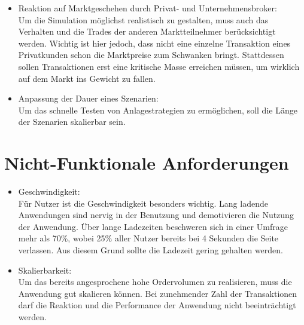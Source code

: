 \begin{itemize}
		\item Reaktion auf Marktgeschehen durch Privat- und Unternehmensbroker: \\
			Um die Simulation möglichst realistisch zu gestalten, muss auch das Verhalten und die Trades der anderen Marktteilnehmer berücksichtigt werden. Wichtig ist hier jedoch, dass nicht eine einzelne Transaktion eines Privatkunden schon die Marktpreise zum Schwanken bringt.
			Stattdessen sollen Transaktionen erst eine kritische Masse erreichen müssen, um wirklich auf dem Markt ins Gewicht zu fallen. 
			
		\item Anpassung der Dauer eines Szenarien: \\
			Um das schnelle Testen von Anlagestrategien zu ermöglichen, soll die Länge der Szenarien skalierbar sein.
	\end{itemize}
	
\section{Nicht-Funktionale Anforderungen}
		\begin{itemize}
		\item Geschwindigkeit: \\
			Für Nutzer ist die Geschwindigkeit besonders wichtig. Lang ladende Anwendungen sind nervig in der Benutzung und demotivieren die Nutzung der Anwendung. Über lange Ladezeiten beschweren sich in einer Umfrage mehr als 70\%, wobei 25\% aller Nutzer bereits bei 4 Sekunden die Seite verlassen. Aus diesem Grund sollte die Ladezeit gering gehalten werden.
			
		\item Skalierbarkeit: \\
			Um das bereits angesprochene hohe Ordervolumen zu realisieren, muss die Anwendung gut skalieren können.
			Bei zunehmender Zahl der Transaktionen darf die Reaktion und die Performance der Anwendung nicht beeinträchtigt werden. 
	\end{itemize}

